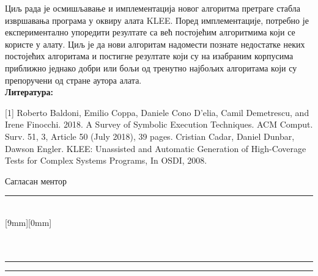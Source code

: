 \documentclass[a4paper]{article}
\begin{document}
\begin{flushleft}
{\begin{minipage}[t][12.2cm]{18cm}

Циљ рада је осмишљавање и имплементација новог алгоритма претраге стабла извршавања програма у оквиру алата KLEE. Поред имплементације, потребно је експериментално упоредити резултате са већ постојећим алгоритмима који се користе у алату. Циљ је да нови алгоритам надомести  познате недостатке неких постојећих алгоритама и постигне резултате који су на изабраним корпусима приближно једнако добри или бољи од тренутно најбољих алгоритама који су препоручени од стране аутора алата. \\

\textbf{Литература:}

[1] Roberto Baldoni, Emilio Coppa, Daniele Cono D’elia, Camil Demetrescu, and Irene Finocchi. 2018. A Survey of Symbolic Execution Techniques. ACM Comput. Surv. 51, 3, Article 50 (July 2018), 39 pages. \newline
[2] Cristian Cadar, Daniel Dunbar, Dawson Engler. KLEE: Unassisted and Automatic Generation of High-Coverage Tests for Complex Systems Programs, In OSDI, 2008. 
\end{minipage}
}
\end{flushleft}
\vspace{0.3cm}
Сагласан ментор  \\
\rule[4mm]{10cm}{.05mm} \hfill {} \\
\raisebox{1cm}%
[9mm][0mm]{} \\
\makebox[10cm]{ }\\
\vspace{-1cm}\\
\rule[2cm]{6.5cm}{.05mm} \hfill \rule[2cm]{6.5cm}{.05mm}\\
\vspace{-2.4cm}\\
\end{document}
